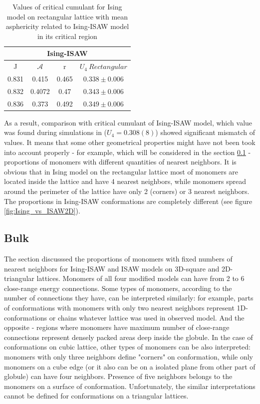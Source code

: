 \begin{table}[h]
    \centering
    \begin{tabular}{|c|c|c|c|}
        \hline
         \multicolumn{4}{|c|}{Ising-ISAW}  \\ \hline
         J & $\mathcal{A}$ & r & $U_{4}\  Rectangular$ \\ \hline
         0.831 & 0.415 & 0.465 & $0.338 \pm 0.006$\\ \hline
         0.832 & 0.4072 & 0.47 & $0.343 \pm 0.006$\\ \hline
         0.836 & 0.373 & 0.492 & $0.349 \pm 0.006$\\ \hline
         \end{tabular}
    \medskip
    \caption{Values of critical cumulant for Ising model on rectangular lattice with mean asphericity related to Ising-ISAW model in its critical region}
    \label{tab:A_r_U}
\end{table}


As a result, comparison with critical cumulant of Ising-ISAW model, which value was found during simulations in \cite{faizullina2021critical} ($U_{4} = 0.308(8)$) showed significant mismatch of values. 
It means that some other geometrical properties might have not been took into account properly - for example, which will be considered in the section \ref{sec:resB} - proportions of monomers with different quantities of nearest neighbors. 
It is obvious that in Ising model on the rectangular lattice most of monomers are located inside the lattice and have 4 nearest neighbors, while monomers spread around the perimeter of the lattice have only 2 (corners) or 3 nearest neighbors. The proportions in Ising-ISAW conformations are completely different (see figure \ref{fig:Ising_vs_ISAW2D}).



\subsection{Bulk}
\label{sec:resB}

The section discusssed the proportions of monomers with fixed numbers of nearest neighbors for Ising-ISAW and ISAW models on 3D-square and 2D-triangular lattices. 
Monomers of all four modified models can have from 2 to 6 close-range energy connections. 
Some types of monomers, according to the number of connections they have, can be interpreted similarly: for example, parts of conformations with monomers with only two nearest neighbors represent 1D-conformations or chains whatever lattice was used in observed model. 
And the opposite - regions where monomers have maximum number of close-range connections represent densely packed areas deep inside the globule. 
In the case of conformations on cubic lattice, other types of monomers can be also interpreted: monomers with only three neighbors define "corners" on conformation, while only monomers on a cube edge (or it also can be on a isolated plane from other part of globule) can have four neighbors. 
Presence of five neighbors belongs to the monomers on a surface of conformation. 
Unfortunately, the similar interpretations cannot be defined for conformations on a triangular lattices.

